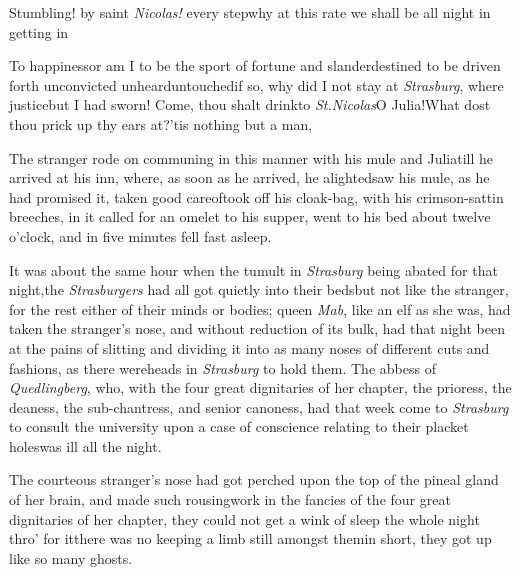 \documentclass{article}
\begin{document}
\tsk Stumbling! by saint \textit{Nicolas!} every step\tsk why at this rate we shall be
all night in getting in\tsh

\tsk To happiness\tsk or am I to be the sport of fortune and
slander\tsk destined to be driven forth unconvicted\tsk
unheard\tsk untouched\tsk if so, why did I not stay at
\textit{Strasburg}, where justice\tsk but I had sworn!\tsk
Come, thou shalt drink\tsk to \textit{St.\@ Nicolas}\tsk O
Julia!\tsh What dost thou prick up thy ears at?\tsh ’tis
nothing but a man, \etc\tsh

The stranger rode on communing in this manner with his mule
and Julia\tsk\break till he arrived at his inn, where, as soon as
he arrived, he alighted\tsk saw his mule, as he had promised
it, taken good care\break of\tsh took off his cloak-bag, with his
crimson-sattin breeches, \etc in it\tsk{}
called for an omelet
to his supper, went to his bed about twelve o’clock, and in
five minutes fell fast asleep.

It was about the same hour when the tumult in \textit{Strasburg}
being abated for that night,\tsh the \textit{Strasburgers} had all
got quietly into their beds\tsk but not like the stranger, for
the rest either of their minds or bodies; queen \textit{Mab}, like an
elf as she was, had taken the stranger’s nose, and without
reduction of its bulk, had that night been at the pains of slitting
and dividing it into as many noses of different cuts and fashions,
as there were\break heads in \textit{Strasburg} to hold them. The abbess of
\textit{Quedlingberg}, who, with the four great dignitaries of her
chapter, the prioress, the deaness, the sub-chantress, and senior
canoness, had that week come to \textit{Strasburg} to consult the
university upon a case of conscience relating to their placket
holes\tsk was ill all the night.

\parskip

The courteous stranger’s nose had got perched upon the top
of the pineal gland of her brain, and made such
rousing\break work in the
fancies of the four great dignitaries of her chapter, they could not get a wink of
sleep the whole night thro’ for it\tsh there was no
keeping a limb still amongst them\tsh in short, they got
up like so many ghosts.

\parskip
\end{document}
